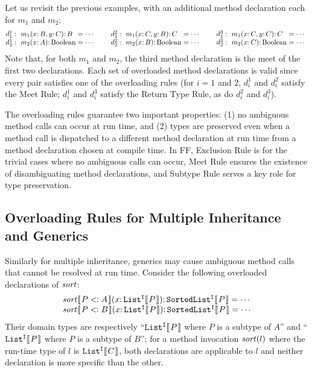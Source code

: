 Let us revisit the previous examples, with an additional
method declaration each for $m_1$ and $m_2$:
\[
\begin{array}[ht]{@{}l@{$\;$}l@{$\;$}l@{\hskip2.5em}l@{$\;$}l@{$\;$}l@{\hskip2.5em}l@{$\;$}l@{$\;$}l}
d_1^1:\ m_1(x \COLON B, y \COLON C) \COLON B &=& \cdots 
& d_1^2:\ m_1(x \COLON C, y \COLON B) \COLON C &=& \cdots 
& d_1^3:\ m_1(x \COLON C, y \COLON C) \COLON C &=& \cdots \\
d_2^1:\ m_2(x \COLON A) \COLON \TYP{Boolean} &=& \cdots
& d_2^2:\ m_2(x \COLON B) \COLON \TYP{Boolean} &=& \cdots
& d_2^3:\ m_2(x \COLON C) \COLON \TYP{Boolean} &=& \cdots
\end{array}\]
Note that, for both $m_1$ and $m_2$, the third method declaration is the
meet of the first two declarations.
Each set of overloaded method
declarations is valid since every pair satisfies one of the overloading
rules (for $i = 1$ and $2$, $d_i^1$ and $d_i^2$ satisfy the Meet Rule; $d_i^1$ and $d_i^3$ satisfy the Return Type Rule, as do $d_i^2$ and $d_i^3$).

The overloading rules guarantee two important properties: (1) no ambiguous
method calls can occur at run time, and (2) types are preserved even when a
method call is dispatched to a different method declaration at run time
from a method declaration chosen at compile time.  In FF, Exclusion Rule
is for the trivial cases where no ambiguous calls can occur, Meet Rule
ensures the existence of disambiguating method declarations,
and Subtype Rule serves a key role for type
preservation.


\subsection{Overloading Rules for Multiple Inheritance and Generics}
\label{sec:motiv:fgf}
Similarly for multiple inheritance, generics may cause ambiguous method
calls that cannot be resolved at run time.  Consider the following
overloaded declarations of $\mbox{\textit{sort}}$:
\[\begin{array}[ht]{l}
\mbox{\textit{sort}}\ob{P \extends A}(x \COLON \kwd{List^I}\ob{P}) \COLON \kwd{SortedList^I}\ob{P}=\cdots\\
\mbox{\textit{sort}}\ob{P \extends B}(x \COLON \kwd{List^I}\ob{P}) \COLON \kwd{SortedList^I}\ob{P}=\cdots\\
\end{array}\]
Their domain types are respectively
``$\kwd{List^I}\ob{P}$ where $P$ is a subtype of $A$''
and ``$\kwd{List^I}\ob{P}$ where $P$ is a subtype of $B$'';
for a method invocation $\mbox{\textit{sort}}(l)$ where the run-time type
of $l$ is $\kwd{List^I}\ob{C}$, both declarations are applicable to $l$ and neither
declaration is more specific than the other.

